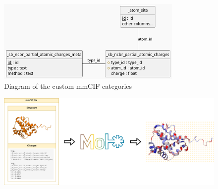 \documentclass[
]{beamer}
\begin{document}
\begin{frame}{}
  \begin{figure}
    \includegraphics[width=0.8\textwidth,keepaspectratio]{images/mmcif_erd.png}
    \caption{Diagram of the custom mmCIF categories}
  \end{figure}
\end{frame}

\begin{frame}{}
  \begin{figure}
    \includegraphics[width=\textwidth,keepaspectratio]{images/molstar-use-case.png}
  \end{figure}
\end{frame}
\end{document}
